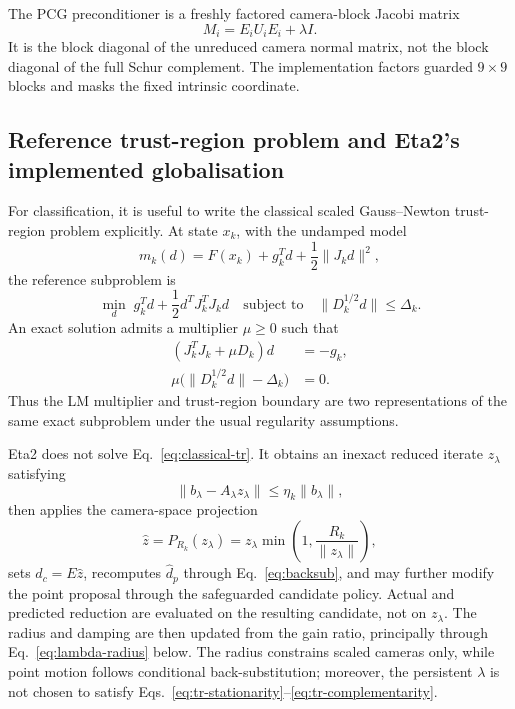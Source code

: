 \documentclass[10pt]{article}
\begin{document}
The PCG preconditioner is a freshly factored camera-block Jacobi matrix
\begin{equation}
  M_i=E_iU_iE_i+\lambda I. \label{eq:preconditioner}
\end{equation}
It is the block diagonal of the unreduced camera normal matrix, not the block diagonal of the full Schur complement.  The implementation factors guarded $9\times9$ blocks and masks the fixed intrinsic coordinate.

\subsection{Reference trust-region problem and Eta2's implemented globalisation}

For classification, it is useful to write the classical scaled Gauss--Newton trust-region problem explicitly.  At state $x_k$, with the undamped model
\begin{equation}
  m_k(d)=F(x_k)+g_k^Td+\frac12\lVert J_kd\rVert^2, \label{eq:gn-model}
\end{equation}
the reference subproblem is
\begin{equation}
  \min_d\;g_k^Td+\frac12d^TJ_k^TJ_kd
  \quad\text{subject to}\quad
  \lVert D_k^{1/2}d\rVert\le\Delta_k. \label{eq:classical-tr}
\end{equation}
An exact solution admits a multiplier $\mu\ge0$ such that
\begin{align}
  (J_k^TJ_k+\mu D_k)d&=-g_k,\label{eq:tr-stationarity}\\
  \mu\bigl(\lVert D_k^{1/2}d\rVert-\Delta_k\bigr)&=0.\label{eq:tr-complementarity}
\end{align}
Thus the LM multiplier and trust-region boundary are two representations of the same exact subproblem under the usual regularity assumptions.

Eta2 does not solve Eq.~\eqref{eq:classical-tr}.  It obtains an inexact reduced iterate $z_\lambda$ satisfying
\begin{equation}
  \lVert b_\lambda-A_\lambda z_\lambda\rVert
  \le\eta_k\lVert b_\lambda\rVert, \label{eq:implemented-inexact}
\end{equation}
then applies the camera-space projection
\begin{equation}
  \widehat z=P_{R_k}(z_\lambda)
  =z_\lambda\min\left(1,\frac{R_k}{\lVert z_\lambda\rVert}\right), \label{eq:implemented-projection}
\end{equation}
sets $\widehat d_c=E\widehat z$, recomputes $\widehat d_p$ through Eq.~\eqref{eq:backsub}, and may further modify the point proposal through the safeguarded candidate policy.  Actual and predicted reduction are evaluated on the resulting candidate, not on $z_\lambda$.  The radius and damping are then updated from the gain ratio, principally through Eq.~\eqref{eq:lambda-radius} below.  The radius constrains scaled cameras only, while point motion follows conditional back-substitution; moreover, the persistent $\lambda$ is not chosen to satisfy Eqs.~\eqref{eq:tr-stationarity}--\eqref{eq:tr-complementarity}.
\end{document}
